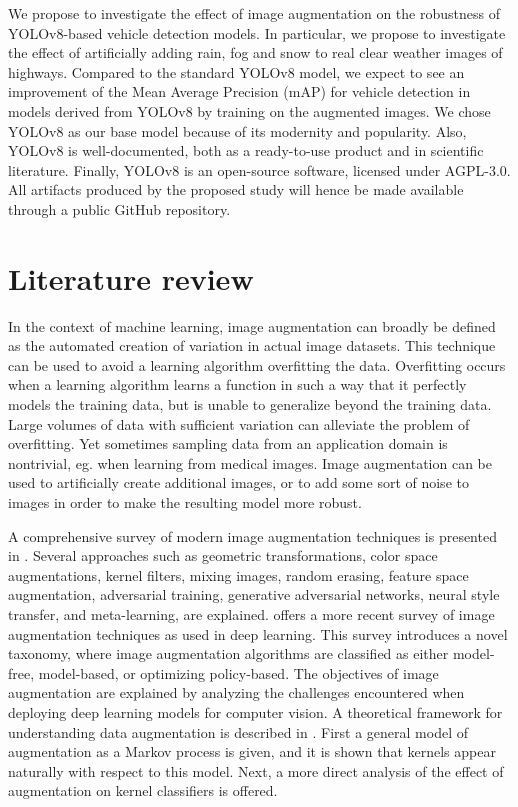 \documentclass[]{article}
\begin{document}
	We propose to investigate the effect of image augmentation on the robustness of YOLO{\small v8}-based vehicle detection models. In particular, we propose to investigate the effect of artificially adding rain, fog and snow to real clear weather images of highways. Compared to the standard YOLO{\small v8} model, we expect to see an improvement of the Mean Average Precision (mAP) for vehicle detection in models derived from YOLO{\small v8} by training on the augmented images. We chose YOLO{\small v8} as our base model because of its modernity and popularity. Also, YOLO{\small v8} is well-documented, both as a ready-to-use product and in scientific literature. Finally, YOLO{\small v8} is an open-source software, licensed under AGPL-3.0. All artifacts produced by the proposed study will hence be made available through a public GitHub repository.  

\section{Literature review}

	In the context of machine learning, image augmentation can broadly be defined as the automated creation of variation in actual image datasets. This technique can be used to avoid a learning algorithm overfitting the data. Overfitting occurs when a learning algorithm learns a function in such a way that it perfectly models the training data, but is unable to generalize beyond the training data. Large volumes of data with sufficient variation can alleviate the problem of overfitting. Yet sometimes sampling data from an application domain is nontrivial, eg. when learning from medical images.  Image augmentation can be used to artificially create additional images, or to add some sort of noise to images in order to make the resulting model more robust.
	
	A comprehensive survey of modern image augmentation techniques is presented in \cite{shortenSurveyImageData2019}. Several approaches such as geometric transformations, color space augmentations, kernel filters, mixing images, random erasing, feature space augmentation, adversarial training, generative adversarial networks, neural style transfer, and meta-learning, are explained. \cite{xuComprehensiveSurveyImage2023} offers a more recent survey of image augmentation techniques as used in deep learning. This survey introduces a novel taxonomy, where image augmentation algorithms are classified as either model-free, model-based, or optimizing policy-based. The objectives of image augmentation are explained by analyzing the challenges encountered when deploying deep learning models for computer vision. A theoretical framework for understanding data augmentation is described in \cite{daoKernelTheoryModern2019}. First a general model of augmentation as a Markov process is given, and it is shown that kernels appear naturally with respect to this model. Next, a more direct analysis of the effect of augmentation on kernel classifiers is offered.
	
\end{document}
